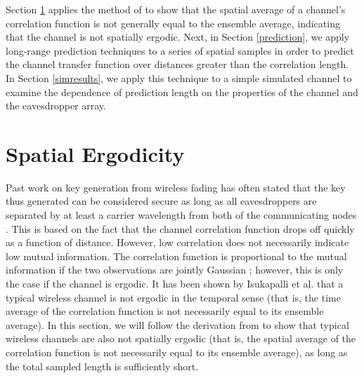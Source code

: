 \documentclass[11pt]{article} %
\begin{document}
Section \ref{ergodicity} applies the method of \cite{isukapalli} to show that the spatial average of a channel's correlation function is not generally equal to the ensemble average, indicating that the channel is not spatially ergodic. Next, in Section \ref{prediction}, we apply long-range prediction techniques to a series of spatial samples in order to predict the channel transfer function over distances greater than the correlation length.  In Section \ref{simresults}, we apply this technique to a simple simulated channel to examine the dependence of prediction length on the properties of the channel and the eavesdropper array. %


\section{Spatial Ergodicity}\label{ergodicity}
Past work on key generation from wireless fading has often stated that the key thus generated can be considered secure as long as all eavesdroppers are separated by at least a carrier wavelength from both of the communicating nodes \cite{some examples}.  This is based on the fact that the channel correlation function drops off quickly as a function of distance.  However, low correlation does not necessarily indicate low mutual information.  The correlation function is proportional to the mutual information if the two observations are jointly Gaussian \cite{that thing that says that}; however, this is only the case if the channel is ergodic.  It has been shown by Isukapalli et al. \cite{isukapalli} that a typical wireless channel is not ergodic in the temporal sense (that is, the time average of the correlation function is not necessarily equal to its ensemble average).  In this section, we will follow the derivation from \cite{isukapalli} to show that typical wireless channels are also not spatially ergodic (that is, the spatial average of the correlation function is not necessarily equal to its ensemble average), as long as the total sampled length is sufficiently short.
\end{document}
